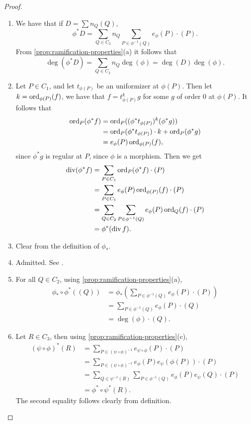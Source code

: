 \begin{proof}
	\begin{enumerate}[label=(\alph*), itemsep=0em]
		\item We have that if $D = \sum n_Q(Q)$,
			\begin{equation*}
				\phi^*D = \sum_{Q \in C_2}n_Q\sum_{P \in \phi^{-1}(Q)}
				e_\phi(P)\cdot(P).
			\end{equation*}
			From \ref{prop:ramification-properties}(a) it follows that
			\begin{equation*}
				\deg(\phi^*D) = \sum_{Q \in C_2}n_Q\deg(\phi) = \deg(D)\deg(\phi).
			\end{equation*}
		\item Let $P\in C_1$, and let $t_{\phi(P)}$ be an uniformizer 
			at $\phi(P)$. Then let $k = \operatorname{ord}_{\phi(P)}(f)$, we have that
			$f = t_{\phi(P)}^k g$ for some $g$ of order $0$ at $\phi(P)$.
			It follows that
			\begin{align*}
				\operatorname{ord}_P(\phi^*f) &= \operatorname{ord}_P((\phi^*t_{\phi(P)})^k(\phi^*g))\\
				&= \operatorname{ord}_P(\phi^*t_{\phi(P)})\cdot k + \operatorname{ord}_P(\phi^*g)\\
				&= e_\phi(P)\operatorname{ord}_{\phi(P)}(f),
			\end{align*}
			since $\phi^*g$ is regular at $P$, since $\phi$ is a morphism.
			Then we get
			\begin{align*}
				\operatorname{div}(\phi^*f) &= \sum_{P \in C_1} \operatorname{ord}_P(\phi^*f)\cdot(P)\\
				&= \sum_{P \in C_1} e_\phi(P)\operatorname{ord}_{\phi(P)}(f)\cdot(P)\\
				&= \sum_{Q \in C_2} \sum_{P \in \phi^{-1}(Q)}
				e_\phi(P)\operatorname{ord}_{Q}(f)\cdot(P)\\
				&= \phi^*(\operatorname{div} f).
			\end{align*}
		\item Clear from the definition of $\phi_*$.
		\item Admitted. See \cite[II.3.6(d)]{silverman}.
		\item For all $Q \in C_2$, using \ref{prop:ramification-properties}(a),
			\begin{align*}
				\phi_*\circ\phi^*((Q)) &= \phi_*\left(
				\sum_{P \in \phi^{-1}(Q)}e_\phi(P)\cdot(P)\right)\\
				&= \sum_{P \in \phi^{-1}(Q)}e_\phi(P)\cdot(Q)\\
				&= \deg(\phi)\cdot(Q).
			\end{align*}
		\item Let $R \in C_3$, then using \ref{prop:ramification-properties}(c),
			\begin{align*}
				(\psi\circ\phi)^*(R) &= \sum_{P \in (\psi\circ\phi)^{-1}}
				e_{\psi\circ\phi}(P)\cdot(P)\\
				&= \sum_{P \in (\psi\circ\phi)^{-1}}
				e_{\phi}(P)e_\psi(\phi(P))\cdot(P)\\
				&= \sum_{Q \in \psi^{-1}(R)}\sum_{P \in \phi^{-1}(Q)}
				e_{\phi}(P)e_\psi(Q)\cdot(P)\\
				&= \phi^*\circ\psi^*(R).
			\end{align*}
			The second equality follows clearly from definition.
	\end{enumerate}
\end{proof}

